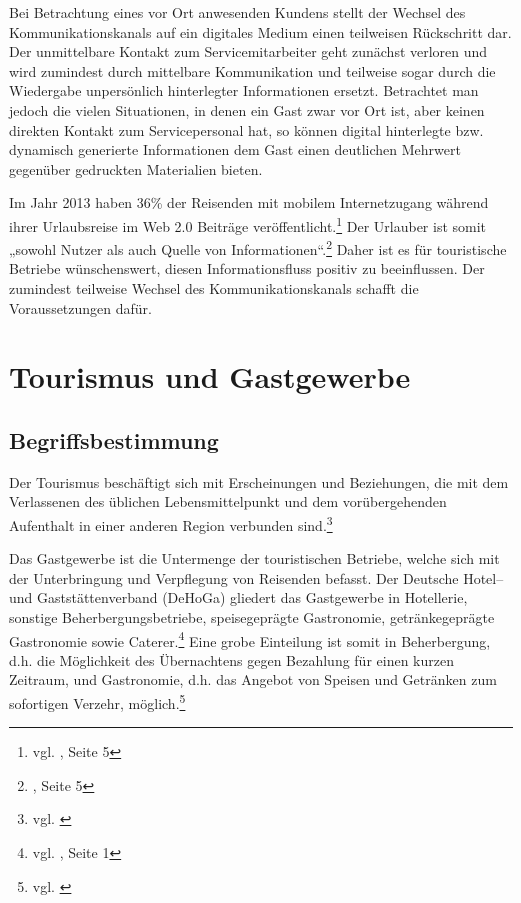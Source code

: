 Bei Betrachtung eines vor Ort anwesenden Kundens stellt der Wechsel des Kommunikationskanals auf ein digitales Medium einen teilweisen Rückschritt dar. Der unmittelbare Kontakt zum Servicemitarbeiter geht zunächst verloren und wird zumindest durch mittelbare Kommunikation und teilweise sogar durch die Wiedergabe unpersönlich hinterlegter Informationen ersetzt.
Betrachtet man jedoch die vielen Situationen, in denen ein Gast zwar vor Ort ist, aber keinen direkten Kontakt zum Servicepersonal hat, so können digital hinterlegte bzw. dynamisch generierte Informationen dem Gast einen deutlichen Mehrwert gegenüber gedruckten Materialien bieten.

Im Jahr 2013 haben 36\% der Reisenden mit mobilem Internetzugang während ihrer Urlaubsreise im Web 2.0 Beiträge veröffentlicht.\footnote{vgl. \cite{reiseanalyse}, Seite 5} Der Urlauber ist somit „sowohl Nutzer als auch Quelle von Informationen“.\footnote{\cite{reiseanalyse}, Seite 5} Daher ist es für touristische Betriebe wünschenswert, diesen Informationsfluss positiv zu beeinflussen. Der zumindest teilweise Wechsel des Kommunikationskanals schafft die Voraussetzungen dafür.

\newpage
\section{Tourismus und Gastgewerbe} %
\label{sec:tourismusbranche}

\subsection{Begriffsbestimmung} %
\label{sub:begriffsbestimmung}
Der Tourismus beschäftigt sich mit Erscheinungen und Beziehungen, die mit dem Verlassenen des üblichen Lebensmittelpunkt und dem vorübergehenden Aufenthalt in einer anderen Region verbunden sind.\footnote{vgl. \cite{gabler:tourismus}}

Das Gastgewerbe ist die Untermenge der touristischen Betriebe, welche sich mit der Unterbringung und Verpflegung von Reisenden befasst. Der Deutsche Hotel– und Gaststättenverband (\ac{DeHoGa}) gliedert das Gastgewerbe in Hotellerie, sonstige Beherbergungsbetriebe, speisegeprägte Gastronomie, getränkegeprägte Gastronomie sowie Caterer.\footnote{vgl. \cite{dehoga:zahlenspiegel}, Seite 1} Eine grobe Einteilung ist somit in Beherbergung, d.h. die Möglichkeit des Übernachtens gegen Bezahlung für einen kurzen Zeitraum, und Gastronomie, d.h. das Angebot von Speisen und Getränken zum sofortigen Verzehr, möglich.\footnote{vgl. \cite{destatis:gastgewerbe}}

